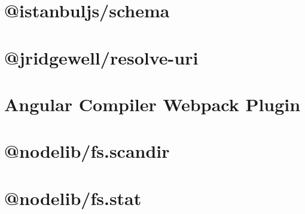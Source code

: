 \documentclass[twoside]{book}
\newcommand{\+}{\discretionary{\mbox{\scriptsize$\hookleftarrow$}}{}{}}
\begin{document}
\chapter{@istanbuljs/schema}
\label{md__c___users_vaishnavi_jadhav__desktop__developer_code_mean_stack_example_client_node_modules__istanbuljs_schema__r_e_a_d_m_e}

\chapter{@jridgewell/resolve-\/uri}
\label{md__c___users_vaishnavi_jadhav__desktop__developer_code_mean_stack_example_client_node_modules__72332d931e810ce46d4e41102f976800}

\chapter{Angular Compiler Webpack Plugin}
\label{md__c___users_vaishnavi_jadhav__desktop__developer_code_mean_stack_example_client_node_modules__ngtools_webpack__r_e_a_d_m_e}

\chapter{@nodelib/fs.scandir}
\label{md__c___users_vaishnavi_jadhav__desktop__developer_code_mean_stack_example_client_node_modules__nodelib_fs_scandir__r_e_a_d_m_e}

\chapter{@nodelib/fs.stat}
\label{md__c___users_vaishnavi_jadhav__desktop__developer_code_mean_stack_example_client_node_modules__nodelib_fs_stat__r_e_a_d_m_e}

\end{document}
